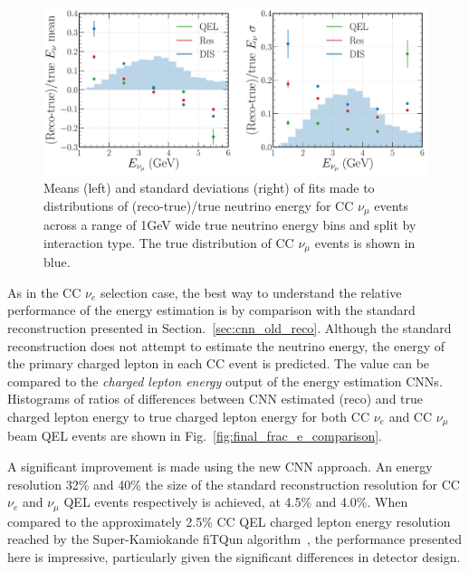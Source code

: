 \begin{figure} %
    \includegraphics[width=\textwidth]{diagrams/7-results/final_energy_numu.pdf}
    \caption[Means and standard deviations of fits to $\nu_{\mu}$ energy distributions]
    {Means (left) and standard deviations (right) of fits made to distributions of
        (reco-true)/true neutrino energy for CC $\nu_{\mu}$ events across a range of \unit{1}{GeV}
        wide true neutrino energy bins and split by interaction type. The true distribution of CC
        $\nu_{\mu}$ events is shown in blue.}
    \label{fig:final_energy_numu}
\end{figure}

As in the CC $\nu_{e}$ selection case, the best way to understand the relative performance of the
energy estimation is by comparison with the standard \chips reconstruction presented in
Section.~\ref{sec:cnn_old_reco}. Although the standard reconstruction does not attempt to estimate
the neutrino energy, the energy of the primary charged lepton in each CC event is predicted. The
value can be compared to the \emph{charged lepton energy} output of the energy estimation CNNs.
Histograms of ratios of differences between CNN estimated (reco) and true charged lepton energy to
true charged lepton energy for both CC $\nu_{e}$ and CC $\nu_{\mu}$ beam QEL events are shown in
Fig.~\ref{fig:final_frac_e_comparison}.

A significant improvement is made using the new CNN approach. An energy resolution 32\% and 40\%
the size of the standard reconstruction resolution for CC $\nu_{e}$ and $\nu_{\mu}$ QEL events
respectively is achieved, at 4.5\% and 4.0\%. When compared to the approximately 2.5\% CC QEL
charged lepton energy resolution reached by the Super-Kamiokande fiTQun
algorithm~\cite{jiang2019}, the performance presented here is impressive, particularly given the
significant differences in detector design.

